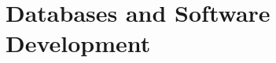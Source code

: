 \documentclass{article}
\begin{document}
    \setcounter{section}{12}
    \section{Databases and Software Development}
    
    
    
    
    
\end{document}
